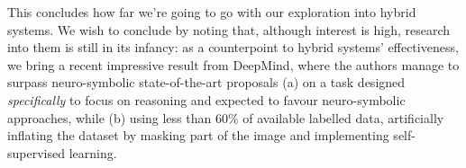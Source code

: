 \documentclass[../main.tex]{subfiles}
\begin{document}
This concludes how far we're going to go with our exploration into hybrid systems. We wish to conclude by noting that, although interest is high, research into them is still in its infancy: as a counterpoint to hybrid systems' effectiveness, we bring a recent impressive result from DeepMind\cite{dingObjectbasedAttentionSpatiotemporal2020}, where the authors manage to surpass neuro-symbolic state-of-the-art proposals (a) on a task designed \textit{specifically} to focus on reasoning and expected to favour neuro-symbolic approaches, while (b) using less than 60\% of available labelled data, artificially inflating the dataset by masking part of the image and implementing self-supervised learning.
\end{document}
